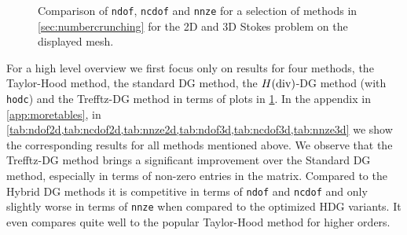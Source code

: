 \documentclass[pdflatex,sn-mathphys,Numbered]{sn-jnl}%
\theoremstyle{remark}%
\theoremstyle{definition}%
\begin{document}
\begin{figure}[ht]
\begin{center}
{}
  \end{center} %
  \caption{Comparison of \texttt{ndof}, \texttt{ncdof} and \texttt{nnze} for a selection of methods in \cref{sec:numbercrunching} for the 2D and 3D Stokes problem on the displayed mesh.}
      \label{fig:stokes:dofscompare}
  \end{figure}

For a high level overview we first focus only on results for four methods, the Taylor-Hood method, the standard DG method, the $H(\operatorname{\mathrm{div}})$-DG method (with \texttt{hodc}) and the Trefftz-DG method in terms of plots in \cref{fig:stokes:dofscompare}.
In the appendix in \cref{app:moretables}, in \cref{tab:ndof2d,tab:ncdof2d,tab:nnze2d,tab:ndof3d,tab:ncdof3d,tab:nnze3d} we show the corresponding results for all methods mentioned above.
We observe that the Trefftz-DG method brings a significant improvement over the Standard DG method, especially in terms of non-zero entries in the matrix.
Compared to the Hybrid DG methods it is competitive in terms of \texttt{ndof} and \texttt{ncdof} and only slightly worse in terms of \texttt{nnze} when compared to the optimized HDG variants.
It even compares quite well to the popular Taylor-Hood method for higher orders.
\end{document}
